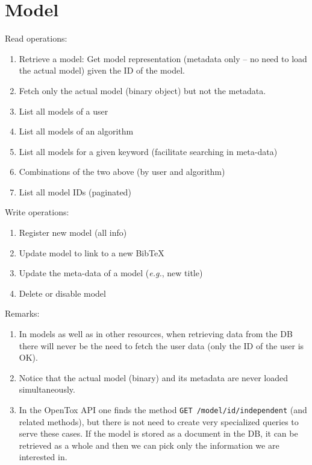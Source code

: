 \section{Model}

\noindent Read operations:
\begin{enumerate}
 \item Retrieve a model: Get model representation (metadata only -- 
       no need to load the actual model) given the ID of the model.
 \item Fetch only the actual model (binary object) but not the metadata. 
 \item List all models of a user
 \item List all models of an algorithm 
 \item List all models for a given keyword (facilitate searching in meta-data)
 \item Combinations of the two above (by user and algorithm)
 \item List all model IDs (paginated)
\end{enumerate}


\noindent Write operations:
\begin{enumerate}
 \item Register new model (all info)
 \item Update model to link to a new BibTeX
 \item Update the meta-data of a model (\textit{e.g.}, new title)
 \item Delete or disable model 
\end{enumerate}


\noindent Remarks:
\begin{enumerate}
 \item In models as well as in other resources, when retrieving data from the 
       DB there will never be the need to fetch the user data (only the ID 
       of the user is OK).
 \item Notice that the actual model (binary) and its metadata are never loaded simultaneously.
 \item In the OpenTox API one finds the method \texttt{GET /model/{id}/independent} 
       (and related methods), but there is not need to create very specialized 
       queries to serve these cases. If the model is stored as a document in the DB, 
       it can be retrieved as a whole and then we can pick only the information we are interested in.
\end{enumerate}





